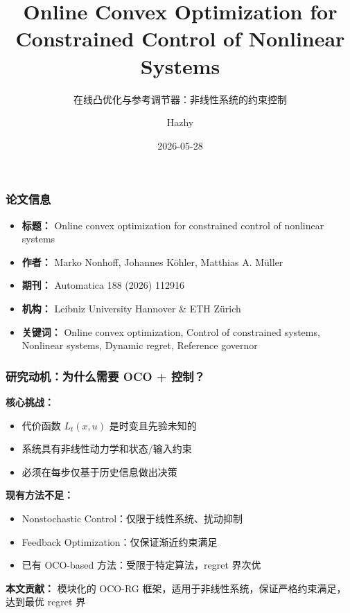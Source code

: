 \documentclass{ltx-talk}
\title{Online Convex Optimization for \\ Constrained Control of Nonlinear Systems}
\subtitle{在线凸优化与参考调节器：非线性系统的约束控制}
\author{Hazhy}
\institute{Paper Review}
\date{2026-05-28}
\begin{document}
\maketitle

\begin{frame}
\frametitle{论文信息}
\begin{itemize}
    \item \textbf{标题：} Online convex optimization for constrained control of nonlinear systems
    \item \textbf{作者：} Marko Nonhoff, Johannes Köhler, Matthias A. Müller
    \item \textbf{期刊：} Automatica 188 (2026) 112916
    \item \textbf{机构：} Leibniz University Hannover \& ETH Zürich
    \item \textbf{关键词：} Online convex optimization, Control of constrained systems, Nonlinear systems, Dynamic regret, Reference governor
\end{itemize}
\end{frame}

\begin{frame}
\frametitle{研究动机：为什么需要 OCO + 控制？}

\textbf{核心挑战：}
\begin{itemize}
    \item 代价函数 $L_t(x,u)$ 是\textcolor{myred}{时变且先验未知}的
    \item 系统具有\textcolor{myred}{非线性动力学}和\textcolor{myred}{状态/输入约束}
    \item 必须在每步仅基于历史信息做出决策
\end{itemize}

\textbf{现有方法不足：}
\begin{itemize}
    \item Nonstochastic Control：仅限于线性系统、扰动抑制
    \item Feedback Optimization：仅保证渐近约束满足
    \item 已有 OCO-based 方法：受限于特定算法，regret 界次优
\end{itemize}

\textbf{本文贡献：} 模块化的 OCO-RG 框架，适用于\textcolor{myblue}{非线性系统}，保证\textcolor{myblue}{严格约束满足}，达到\textcolor{myblue}{最优 regret 界}
\end{frame}
\end{document}
